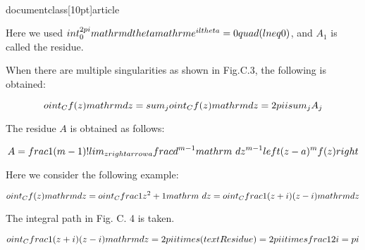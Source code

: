 \\documentclass[10pt]{article}
\begin{document}
{{{{{{Here we used $\\int_{0}^{2 \\pi} \\mathrm{d} \\theta \\mathrm{e}^{i l \\theta}=0 \\quad(l \\neq 0)$, and $A_{1}$ is called the residue.

When there are multiple singularities as shown in Fig.C.3, the following is obtained:

$$
\\oint_{C} f(z) \\mathrm{d} z=\\sum_{j} \\oint_{C} f(z) \\mathrm{d} z=2 \\pi i \\sum_{j} A_{j}
$$

The residue $A$ is obtained as follows:

$$
A=\\frac{1}{(m-1) !} \\lim _{z \\rightarrow a} \\frac{d^{m-1}}{\\mathrm{~d} z^{m-1}}\\left\\{(z-a)^{m} f(z)\\right\\}
$$

Here we consider the following example:

$$
\\oint_{C} f(z) \\mathrm{d} z=\\oint_{C} \\frac{1}{z^{2}+1} \\mathrm{~d} z=\\oint_{C} \\frac{1}{(z+i)(z-i)} \\mathrm{d} z
$$

The integral path in Fig. C. 4 is taken.

$$
\\oint_{C} \\frac{1}{(z+i)(z-i)} \\mathrm{d} z=2 \\pi i \\times(\\text { Residue })=2 \\pi i \\times \\frac{1}{2 i}=\\pi
$$

}}}}}}
\end{document}
